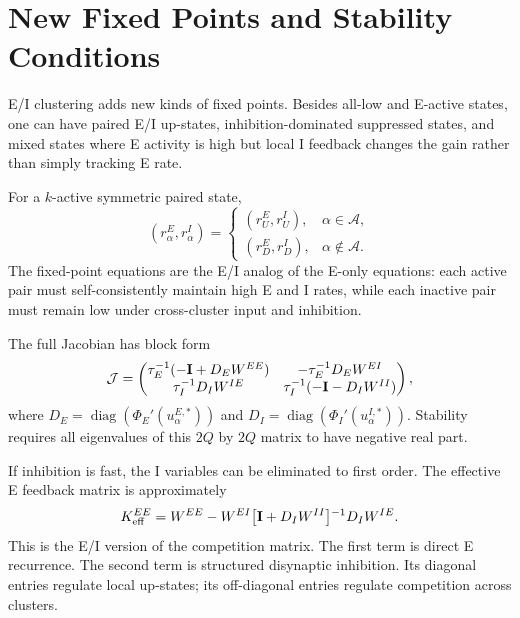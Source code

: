 \section{New Fixed Points and Stability Conditions}
\label{sec:new-fixed-points-stability-conditions}

E/I clustering adds new kinds of fixed points. Besides all-low and E-active states, one can have paired E/I up-states, inhibition-dominated suppressed states, and mixed states where E activity is high but local I feedback changes the gain rather than simply tracking E rate.

For a $k$-active symmetric paired state,
%
\begin{equation}
  (r_{\alpha}^{E},r_{\alpha}^{I})
  =
  \begin{cases}
    (r_U^E,r_U^I), & \alpha\in\mathcal{A},\\
    (r_D^E,r_D^I), & \alpha\notin\mathcal{A}.
  \end{cases}
  \label{eq:ei-k-active-ansatz}
\end{equation}
%
The fixed-point equations are the E/I analog of the E-only equations: each active pair must self-consistently maintain high E and I rates, while each inactive pair must remain low under cross-cluster input and inhibition.

The full Jacobian has block form
%
\begin{equation}
  \mathcal{J}
  =
  \begin{pmatrix}
    \tau_E^{-1}(-\mathbf{I} + D_E W^{EE}) &
    -\tau_E^{-1}D_E W^{EI} \\
    \tau_I^{-1}D_I W^{IE} &
    \tau_I^{-1}(-\mathbf{I} - D_I W^{II})
  \end{pmatrix},
  \label{eq:ei-block-jacobian}
\end{equation}
%
where $D_E=\operatorname{diag}(\Phi_E'(u_{\alpha}^{E,*}))$ and $D_I=\operatorname{diag}(\Phi_I'(u_{\alpha}^{I,*}))$. Stability requires all eigenvalues of this $2Q$ by $2Q$ matrix to have negative real part.

If inhibition is fast, the I variables can be eliminated to first order. The effective E feedback matrix is approximately
%
\begin{equation}
  K_{\mathrm{eff}}^{EE}
  =
  W^{EE}
  -
  W^{EI}
  \bigl[\mathbf{I}+D_I W^{II}\bigr]{}^{-1}
  D_I W^{IE}.
  \label{eq:ei-schur-effective-feedback}
\end{equation}
%
This is the E/I version of the competition matrix. The first term is direct E recurrence. The second term is structured disynaptic inhibition. Its diagonal entries regulate local up-states; its off-diagonal entries regulate competition across clusters.

